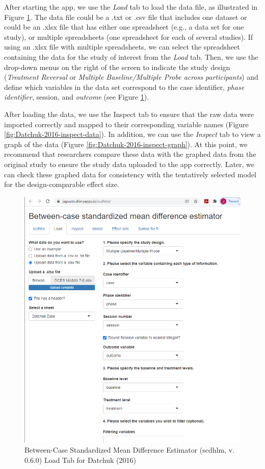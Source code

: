 \documentclass[
]{book}
\begin{document}
After starting the app, we use the \emph{Load} tab to load the data file, as illustrated in Figure \ref{fig:Datchuk-2016-load}. The data file could be a .txt or .csv file that includes one dataset or could be an .xlsx file that has either one spreadsheet (e.g., a data set for one study), or multiple spreadsheets (one spreadsheet for each of several studies). If using an .xlsx file with multiple spreadsheets, we can select the spreadsheet containing the data for the study of interest from the \emph{Load} tab. Then, we use the drop-down menus on the right of the screen to indicate the study design (\emph{Treatment Reversal} or \emph{Multiple Baseline/Multiple Probe across participants}) and define which variables in the data set correspond to the case identifier, \emph{phase identifier}, session, and \emph{outcome} (see Figure \ref{fig:Datchuk-2016-load}).

After loading the data, we use the Inspect tab to ensure that the raw data were imported correctly and mapped to their corresponding variable names (Figure \ref{fig:Datchuk-2016-inspect-data}). In addition, we can use the \emph{Inspect} tab to view a graph of the data (Figure \ref{fig:Datchuk-2016-inspect-graph}). At this point, we recommend that researchers compare these data with the graphed data from the original study to ensure the study data uploaded to the app correctly. Later, we can check these graphed data for consistency with the tentatively selected model for the design-comparable effect size.

\begin{figure}
\includegraphics[width=0.6\linewidth]{images/app.load_Datchuk2016} \caption{Between-Case Standardized Mean Difference Estimator (scdhlm, v. 0.6.0) Load Tab for Datchuk (2016)}\label{fig:Datchuk-2016-load}
\end{figure}
\end{document}

